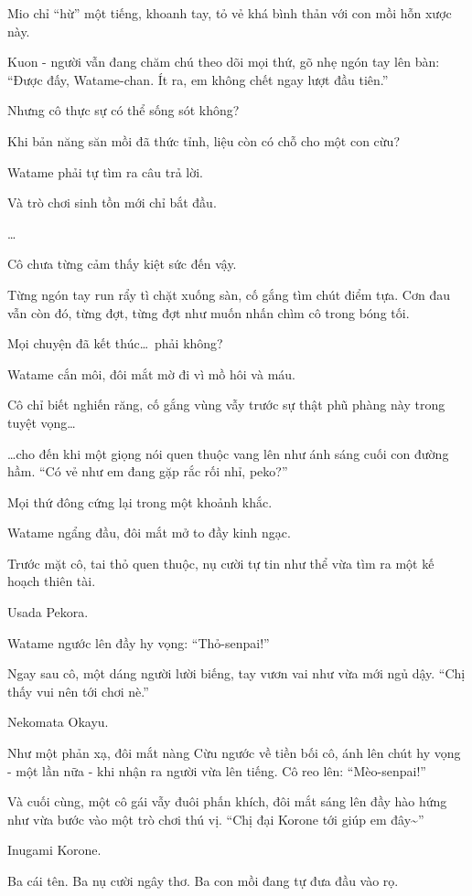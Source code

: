 \documentclass[../main.tex]{subfiles}
\begin{document}
Mio chỉ ``hừ'' một tiếng, khoanh tay, tỏ vẻ khá bình thản với con mồi hỗn xược này.

Kuon - người vẫn đang chăm chú theo dõi mọi thứ, gõ nhẹ ngón tay lên bàn: ``Được đấy, Watame-chan. Ít ra, em không chết ngay lượt đầu tiên.''

Nhưng cô thực sự có thể sống sót không?

Khi bản năng săn mồi đã thức tỉnh, liệu còn có chỗ cho một con cừu?

Watame phải tự tìm ra câu trả lời.

Và trò chơi sinh tồn mới chỉ bắt đầu.

\dots

Cô chưa từng cảm thấy kiệt sức đến vậy.

Từng ngón tay run rẩy tì chặt xuống sàn, cố gắng tìm chút điểm tựa. Cơn đau vẫn còn đó, từng đợt, từng đợt như muốn nhấn chìm cô trong bóng tối.

Mọi chuyện đã kết thúc\dots\ phải không?

Watame cắn môi, đôi mắt mờ đi vì mồ hôi và máu.

Cô chỉ biết nghiến răng, cố gắng vùng vẫy trước sự thật phũ phàng này trong tuyệt vọng\dots

\dots cho đến khi một giọng nói quen thuộc vang lên như ánh sáng cuối con đường hầm. ``Có vẻ như em đang gặp rắc rối nhỉ, peko?''

Mọi thứ đông cứng lại trong một khoảnh khắc.

Watame ngẩng đầu, đôi mắt mở to đầy kinh ngạc.

Trước mặt cô, tai thỏ quen thuộc, nụ cười tự tin như thể vừa tìm ra một kế hoạch thiên tài.

Usada Pekora.

Watame ngước lên đầy hy vọng: ``Thỏ-senpai!''

Ngay sau cô, một dáng người lười biếng, tay vươn vai như vừa mới ngủ dậy. ``Chị thấy vui nên tới chơi nè.''

Nekomata Okayu.

Như một phản xạ, đôi mắt nàng Cừu ngước về tiền bối cô, ánh lên chút hy vọng - một lần nữa - khi nhận ra người vừa lên tiếng. Cô reo lên: ``Mèo-senpai!''

Và cuối cùng, một cô gái vẫy đuôi phấn khích, đôi mắt sáng lên đầy hào hứng như vừa bước vào một trò chơi thú vị. ``Chị đại Korone tới giúp em đây\~{}''

Inugami Korone.

Ba cái tên. Ba nụ cười ngây thơ. Ba con mồi đang tự đưa đầu vào rọ.
\end{document}
